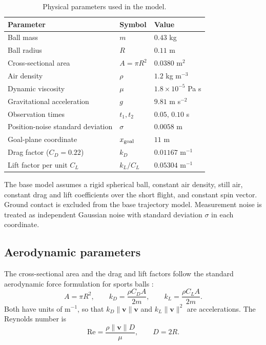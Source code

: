 \documentclass[11pt,a4paper]{article}
\begin{document}
\begin{table}[H]
\centering
\caption{Physical parameters used in the model.}
\label{tab:parameters}
\begin{tabular}{lll}
\toprule
Parameter & Symbol & Value\\
\midrule
Ball mass & $m$ & $0.43$ kg\\
Ball radius & $R$ & $0.11$ m\\
Cross-sectional area & $A=\pi R^2$ & $0.0380$ m$^2$\\
Air density & $\rho$ & $1.2$ kg m$^{-3}$\\
Dynamic viscosity & $\mu$ & $1.8\times10^{-5}$ Pa s\\
Gravitational acceleration & $g$ & $9.81$ m s$^{-2}$\\
Observation times & $t_1,t_2$ & $0.05,\,0.10$ s\\
Position-noise standard deviation & $\sigma$ & $0.0058$ m\\
Goal-plane coordinate & $x_{\rm goal}$ & $11$ m\\
Drag factor ($C_D=0.22$) & $k_D$ & $0.01167$ m$^{-1}$\\
Lift factor per unit $C_L$ & $k_L/C_L$ & $0.05304$ m$^{-1}$\\
\bottomrule
\end{tabular}
\end{table}

The base model assumes a rigid spherical ball, constant air density, still air, constant drag and lift coefficients over the short flight, and constant spin vector. Ground contact is excluded from the base trajectory model. Measurement noise is treated as independent Gaussian noise with standard deviation $\sigma$ in each coordinate.

\subsection{Aerodynamic parameters}
The cross-sectional area and the drag and lift factors follow the standard aerodynamic force formulation for sports balls \citep{mehta1985,asai2007}:
\begin{equation}
 A=\pi R^2,\qquad
 k_D=\frac{\rho C_D A}{2m},\qquad
 k_L=\frac{\rho C_L A}{2m}.
 \label{eq:kdkl}
\end{equation}
Both have units of m$^{-1}$, so that $k_D\|\bm v\|\bm v$ and $k_L\|\bm v\|^2$ are accelerations. The Reynolds number is
\begin{equation}
    \mathrm{Re}=\frac{\rho \|\bm v\|D}{\mu},\qquad D=2R.
\end{equation}
\end{document}
